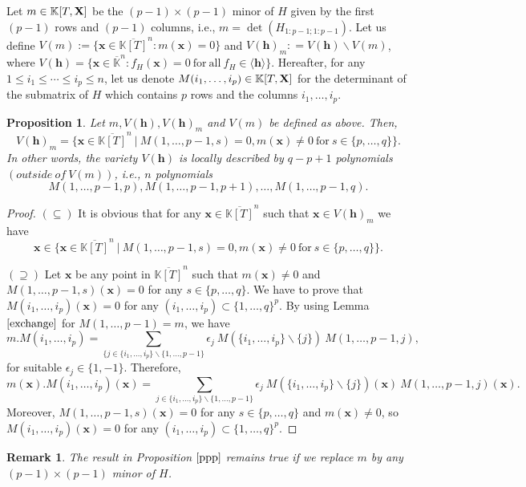 \documentclass[11pt]{article}
\numberwithin{Property}{section}
\numberwithin{Theorem}{section}
\newtheorem{Proposition}{Proposition}%
\numberwithin{Proposition}{section}
\numberwithin{Lemma}{section}
\numberwithin{Corollary}{section}
\numberwithin{Definition}{section}
\newtheorem{Remark}{Remark}%
\numberwithin{Remark}{section}
\numberwithin{Conjecture}{section}
\numberwithin{Problem}{section}
\numberwithin{Claim}{section}
\theoremstyle{definition}
\numberwithin{Example}{section}
\def\h {\ensuremath{\mathbf{h}}}
\renewcommand{\leq}{\leqslant}
\def\bar{\overline}
\newcommand{\field}{\mathbb{K}} %
\newcommand{\mat}[1]{\mathbf{\MakeUppercase{#1}}} %
\begin{document}
Let $m \in \field[T,\mat{X}]$ be the $(p-1) \times (p-1)$ minor of $H$ given by the first $(p-1)$ rows and $(p-1)$ columns, i.e., $m = \det(H_{1:p-1;1:p-1})$. Let us define $V(m) := \{\mathbf{x} \in \bar{\field[T]}^n : m(\mathbf{x}) = 0\}$ and $V(\h)_m : = V(\h) \backslash V(m)$, where $V(\h) = \{\mathbf{x} \in \bar{\field}^{n} : f_H(\mathbf{x}) = 0 \ \mathrm{for \ all} \ f_H \in \langle \h \rangle \}$. Hereafter, for any $1 \leq i_1 \leq \cdots \leq i_p \leq n$, let us denote $M(i_1, \ldots, i_p) \in \field[T,\mat{X}]$ for the determinant of the submatrix of $H$ which contains $p$ rows and the columns $i_1, \ldots, i_p$. 
\begin{Proposition} \label{ppp} Let $m, V(\h), V(\h)_m$ and $V(m)$ be defined as above. Then, 
\[
V(\h)_m = \{\mathbf{x} \in \bar{\field[T]}^n \ | \ M(1, \ldots, p-1, s) = 0, m(\mathbf{x}) \ne 0 \ \mathrm{for} \ s \in \{p, \ldots, q\} \}.
\] In other words, the variety $V(\h)$ is locally described by $q - p + 1$ polynomials $(outside \ of \ V(m))$, i.e., $n$ polynomials 
\[
M(1, \ldots, p-1, p), M(1, \ldots, p-1, p+	1), \ldots, M(1, \ldots, p-1, q).
\]
\end{Proposition}
\begin{proof}
$(\subseteq)$ It is obvious that for any $\mathbf{x} \in \bar{\field[T]}^n$ such that $\mathbf{x} \in V(\h)_m$ we have 
\[\mathbf{x} \in \{\mathbf{x} \in \bar{\field[T]}^n \ | \ M(1, \ldots, p-1, s) = 0, m(\mathbf{x}) \ne 0 \ \mathrm{for} \ s \in \{p, \ldots, q\} \}.\]

$(\supseteq)$ Let $\mathbf{x}$ be any point in $\bar{\field[T]}^n$ such that $m(\mathbf{x}) \ne 0$ and $M(1, \ldots, p-1, s)(\mathbf{x}) = 0$ for any $s \in \{p, \ldots, q\}$. We have to prove that $M(i_1, \ldots, i_p)(\mathbf{x}) = 0$ for any $(i_1, \ldots, i_p) \subset \{1, \ldots, q\}^p$. By using Lemma $\ref{exchange}$ for $M(1, \ldots, p-1) = m$, we have 
\[
m.M(i_1, \ldots, i_p) = \sum_{\{j \in \{i_1, \ldots, i_p\} \backslash \{1, \ldots, p-1 \} } \epsilon_j \ M(\{i_1, \ldots, i_p\} \backslash \{j\}) \ M(1, \ldots, p-1,j),
\] for suitable $\epsilon_j \in \{1,-1\}$. Therefore, 
\[
m(\mathbf{x}).M(i_1, \ldots, i_p)(\mathbf{x}) = \sum_{j \in \{i_1, \ldots, i_p\} \backslash \{1, \ldots, p-1 \} } \epsilon_j \ M(\{i_1, \ldots, i_p\} \backslash \{j\})(\mathbf{x}) \ M(1, \ldots, p-1,j)(\mathbf{x}). 
\] Moreover, $M(1, \ldots, p-1, s)(\mathbf{x}) = 0$ for any $s \in \{p, \ldots, q\}$ and $m(\mathbf{x}) \ne 0$, so $M(i_1, \ldots, i_p)(\mathbf{x}) = 0$ for any $(i_1, \ldots, i_p) \subset \{1, \ldots, q\}^p$. 
\end{proof}
\begin{Remark}The result in Proposition $\ref{ppp}$ remains true if we replace $m$ by any $(p-1) \times (p-1)$ minor of $H$. 
\end{Remark}
\end{document}
